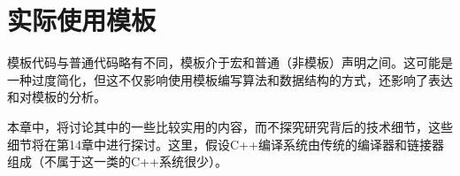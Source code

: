 \chapter{实际使用模板}
模板代码与普通代码略有不同，模板介于宏和普通（非模板）声明之间。这可能是一种过度简化，但这不仅影响使用模板编写算法和数据结构的方式，还影响了表达和对模板的分析。

本章中，将讨论其中的一些比较实用的内容，而不探究研究背后的技术细节，这些细节将在第14章中进行探讨。这里，假设C++编译系统由传统的编译器和链接器组成（不属于这一类的C++系统很少）。





